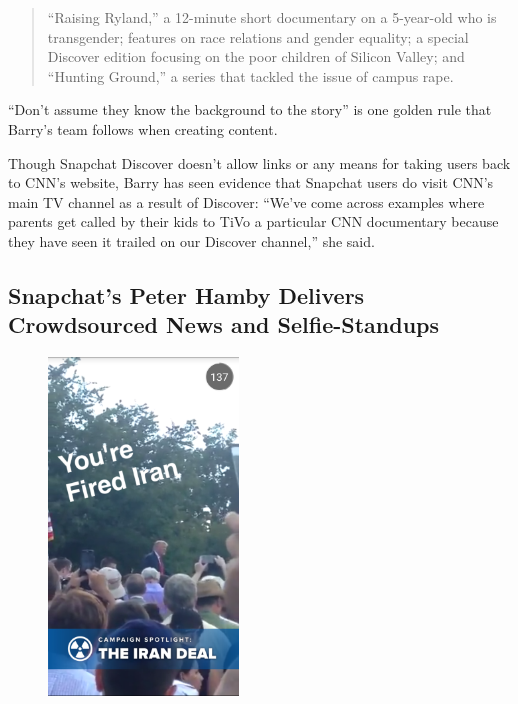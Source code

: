 \documentclass[notoc, symmetric, nobib, nols]{towcenter-guideto-book}
\begin{document}
\begin{quote}
``Raising Ryland,'' a 12-minute short documentary on a 5-year-old who is transgender; features on race relations and gender equality; a special Discover edition focusing on the poor children of Silicon Valley; and ``Hunting Ground,'' a series that tackled the issue of campus rape. 
\end{quote}

``Don't assume they know the background to the story'' is one golden rule that Barry's team follows when creating content.




Though Snapchat Discover doesn't allow links or any means for taking users back to CNN's website, Barry has seen evidence that Snapchat users do visit CNN's main TV channel as a result of Discover: ``We've come across examples where parents get called by their kids to TiVo a particular CNN documentary because they have seen it trailed on our Discover channel,'' she said. 
\newpage
\subsection{Snapchat's Peter Hamby Delivers Crowdsourced News and Selfie-Standups}

\begin{figure}
\includegraphics[width=0.45\textwidth]{graphics/CHATAPPS_Page29_Iran2.png} 
\end{figure}
\end{document}
